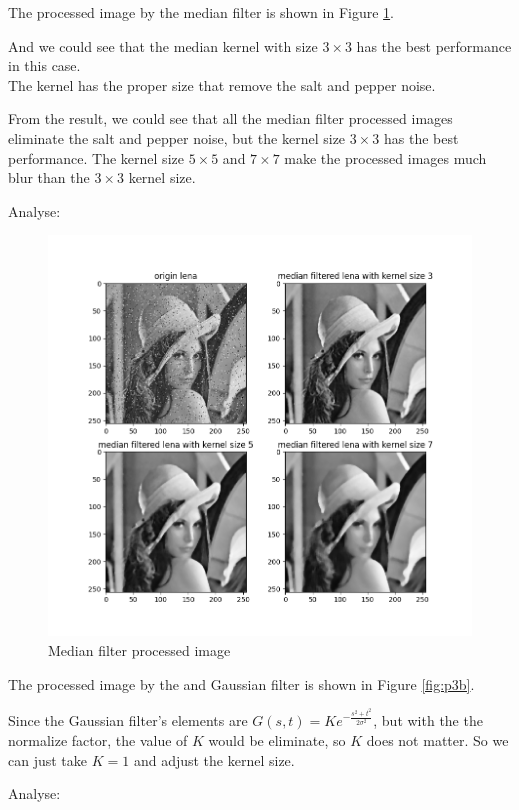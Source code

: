 \problem{}
The processed image by the median filter is shown in Figure \ref{fig:p3a}.

And we could see that the median kernel with size $3 \times 3$ has the best performance in this case.\\
The kernel has the proper size that remove the salt and pepper noise.

From the result, we could see that all the median filter processed images eliminate the salt and pepper noise, but the kernel size $3 \times 3$ has the best performance. The kernel size $5 \times 5$ and $7 \times 7$ make the 
processed images much blur than the $3 \times 3$ kernel size.

Analyse:


\begin{figure}[htbp]
    \centering
	\includegraphics[width=\textwidth]{../images/p3/p3a.png}
    \caption{Median filter processed image}
\label{fig:p3a}
\end{figure}

The processed image by the and Gaussian filter is shown in Figure \ref{fig:p3b}.

Since the Gaussian filter's elements are $G(s,t)=Ke^{-\frac{s^2+t^2}{2\sigma^2}}$, but with the the normalize factor, the value of
$K$ would be eliminate, so $K$ does not matter. So we can just take $K=1$ and adjust the kernel size.

Analyse:


